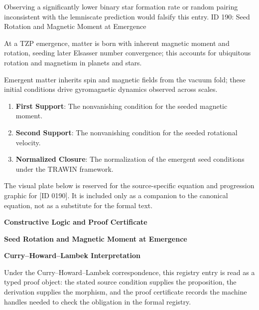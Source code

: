 Observing a significantly lower binary star formation rate or random pairing inconsistent with the lemniscate prediction would falsify this entry. ID 190: Seed Rotation and Magnetic Moment at Emergence  

At a TZP emergence, matter is born with inherent magnetic moment and rotation, seeding later Elsasser number convergence; this accounts for ubiquitous rotation and magnetism in planets and stars.  

Emergent matter inherits spin and magnetic fields from the vacuum fold; these initial conditions drive gyromagnetic dynamics observed across scales.
\endgroup

\begin{enumerate}[leftmargin=1.6em,itemsep=6pt,topsep=4pt]
\item \textbf{First Support}: The nonvanishing condition for the seeded magnetic moment.
\item \textbf{Second Support}: The nonvanishing condition for the seeded rotational velocity.
\item \textbf{Normalized Closure}: The normalization of the emergent seed conditions under the TRAWIN framework.
\end{enumerate}

\begingroup\footnotesize\sloppy
The visual plate below is reserved for the source-specific equation and progression graphic for [ID 0190]. It is included only as a companion to the canonical equation, not as a substitute for the formal text.
\par\endgroup
\ifTZPDarkEdition
{}
\fi

\clearpage
\begingroup\tzpsupportsetup
\noindent\textbf{\fontsize{10.8pt}{12.8pt}\selectfont [ID 0190] Constructive Logic and Proof Certificate}\par
\noindent\textbf{\fontsize{10pt}{12pt}\selectfont Seed Rotation and Magnetic Moment at Emergence}\par
\vspace{0.45em}
\begingroup
\footnotesize
\setlength{\parskip}{0.22em}
\setlength{\parindent}{0pt}
\noindent\textbf{Curry--Howard--Lambek Interpretation}\par
Under the Curry--Howard--Lambek correspondence, this registry entry is read as a typed proof
object: the stated source condition supplies the proposition, the derivation supplies the
morphism, and the proof certificate records the machine handles needed to check the obligation
in the formal registry.

